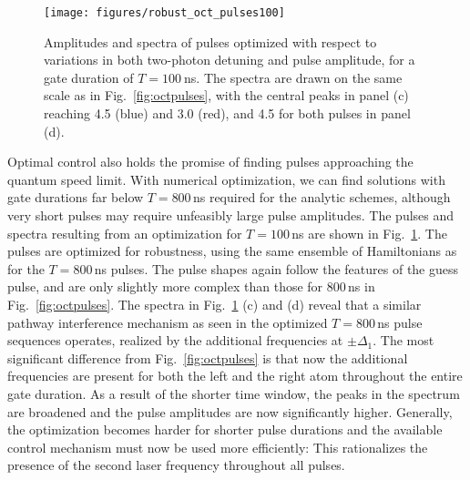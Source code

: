 \begin{figure}[tb]
  \centering
  \texttt{[image: figures/robust\_oct\_pulses100]}
  \caption{%
  Amplitudes and spectra of pulses optimized with respect to variations
  in both two-photon detuning and pulse amplitude, for a gate duration of
  $T=100~$ns. The spectra are drawn on the same scale as in
  Fig.~\ref{fig:octpulses}, with the central peaks in panel (c) reaching 4.5
  (blue) and 3.0 (red), and 4.5 for both pulses in panel (d).
  }
  \label{fig:octpulses100}
\end{figure}
Optimal control also holds the promise of finding pulses approaching the quantum
speed limit. With numerical optimization, we can find solutions with
gate durations far below $T=800\,$ns 
required for the analytic schemes, although very short pulses may require
unfeasibly large pulse amplitudes.
The pulses and spectra resulting from an
optimization for $T=100\,$ns are shown in Fig.~\ref{fig:octpulses100}. The
pulses are optimized for robustness, using the same ensemble of Hamiltonians
as for the $T=800\,$ns pulses. The pulse shapes again follow the features of the
guess pulse, and are only slightly more complex than those for 800$\,$ns in
Fig.~\ref{fig:octpulses}.
The spectra in Fig.~\ref{fig:octpulses100} (c) and (d)  reveal that
a similar pathway interference 
mechanism as seen in the optimized  $T=800\,$ns pulse sequences 
operates, realized by the additional frequencies at $\pm
\Delta_1$. The most significant 
difference from Fig.~\ref{fig:octpulses} is that now the additional frequencies
are present for both the left and the right atom throughout the entire gate
duration. As a result of the shorter time window, 
the peaks in the spectrum are broadened and the
pulse amplitudes are now significantly higher. Generally, the optimization
becomes harder for shorter pulse durations and the available control
mechanism must now be used more efficiently: This rationalizes the
presence of the 
second laser frequency throughout all pulses.

